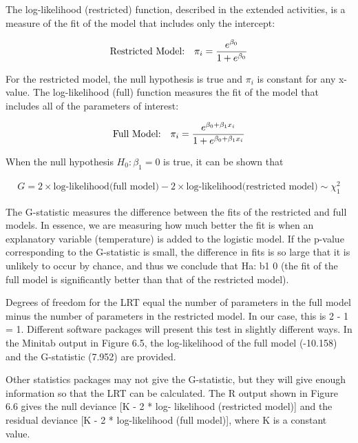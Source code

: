 \documentclass[
]{report}
\begin{document}
The log-likelihood (restricted) function, described in the extended activities, is a measure of the fit of the model that includes only the intercept:

\begin{align}
\text{Restricted Model:} \quad \pi_i = \frac{e^{\beta_0}}{1 + e^{\beta_0}}
\notag
\end{align}

For the restricted model, the null hypothesis is true and \(\pi_i\) is constant for any x-value. The log-likelihood (full) function measures the fit of the model that includes all of the parameters of interest:

\begin{align}
\text{Full Model:} \quad \pi_i = \frac{e^{\beta_0 + \beta_1 x_i}}{1 + e^{\beta_0 + \beta_1 x_i}}
\notag
\end{align}

When the null hypothesis \(H_0: \beta_1 = 0\) is true, it can be shown that

\begin{align}
G = 2 \times \text{log-likelihood(full model)} - 2 \times \text{log-likelihood(restricted model)} \sim \chi^2_1 
\tag{6.15}
\end{align}

The G-statistic measures the difference between the fits of the restricted and full models. In essence, we
are measuring how much better the fit is when an explanatory variable (temperature) is added to the logistic
model. If the p-value corresponding to the G-statistic is small, the difference in fits is so large that it is unlikely
to occur by chance, and thus we conclude that Ha: b1 0 (the fit of the full model is significantly better than
that of the restricted model).

Degrees of freedom for the LRT equal the number of parameters in the full model minus the number of
parameters in the restricted model. In our case, this is 2 - 1 = 1. Different software packages will present
this test in slightly different ways. In the Minitab output in Figure 6.5, the log-likelihood of the full model
(-10.158) and the G-statistic (7.952) are provided.

Other statistics packages may not give the G-statistic, but they will give enough information so that
the LRT can be calculated. The R output shown in Figure 6.6 gives the null deviance {[}K - 2 * log-
likelihood (restricted model){]} and the residual deviance {[}K - 2 * log-likelihood (full model){]}, where
K is a constant value.
\end{document}
